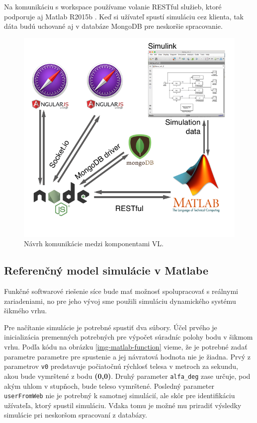 Na komunikáciu s workspace používame volanie RESTful služieb, ktoré podporuje aj Matlab R2015b \cite{matlab-restful}. Keď si užívateľ spustí simuláciu cez klienta, tak dáta budú uchované aj v databáze MongoDB pre neskoršie spracovanie.

\begin{figure}[H]
  \centering
  \includegraphics[scale=0.45]{img/StarkLab.png}
  \caption{Návrh komunikácie medzi komponentami VL.}
  \label{img-software-designl}
\end{figure}

\subsection{Referenčný model simulácie v Matlabe}
Funkčné softwarové riešenie síce bude mať možnosť spolupracovať s reálnymi zariadeniami, no pre jeho vývoj sme použili simuláciu dynamického systému šikmého vrhu.

Pre načítanie simulácie je potrebné spustiť dva súbory. Účel prvého je inicializácia premenných potrebných pre výpočet súradníc polohy bodu v šikmom vrhu. Podľa kódu na obrázku \ref{img-matlab-function} vieme, že je potrebné zadať parametre parametre pre spustenie a jej návratová hodnota nie je žiadna. Prvý z parametrov \verb|v0| predstavuje počiatočnú rýchlosť telesa v metroch za sekundu, akou bude vymrštené z bodu \textbf{(0,0)}. Druhý parameter \verb|alfa_deg| zase určuje, pod akým uhlom v stupňoch, bude teleso vymrštené. Posledný parameter \verb|userFromWeb| nie je potrebný k samotnej simulácií, ale skôr pre identifikáciu užívateľa, ktorý spustil simuláciu. Vďaka tomu je možné mu priradiť výsledky simulácie pri neskoršom spracovaní z databázy.

